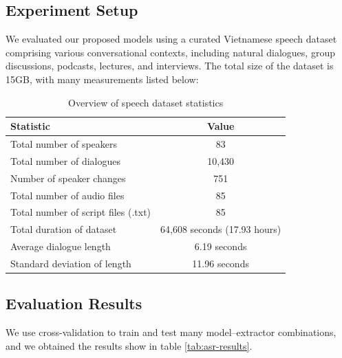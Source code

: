 \documentclass[conference]{IEEEtran}
\begin{document}
\subsection{Experiment Setup}
We evaluated our proposed models using a curated Vietnamese speech dataset comprising various conversational contexts, including natural dialogues, group discussions, podcasts, lectures, and interviews.
The total size of the dataset is 15GB, with many measurements listed below:
\begin{table}[h]
    \centering
    \caption{Overview of speech dataset statistics}
    \begin{tabular}{|l|c|}
        \hline
        \textbf{Statistic}                  & \textbf{Value}               \\
        \hline
        Total number of speakers            & 83                           \\
        Total number of dialogues           & 10,430                       \\
        Number of speaker changes           & 751                          \\
        Total number of audio files         & 85                           \\
        Total number of script files (.txt) & 85                           \\
        Total duration of dataset           & 64,608 seconds (17.93 hours) \\
        Average dialogue length             & 6.19 seconds                 \\
        Standard deviation of length        & 11.96 seconds                \\
        \hline
    \end{tabular}
\end{table}

\subsection{Evaluation Results}
We use cross-validation to train and test many model–extractor combinations, and we obtained the results show in table \ref{tab:asr-results}.
\end{document}
